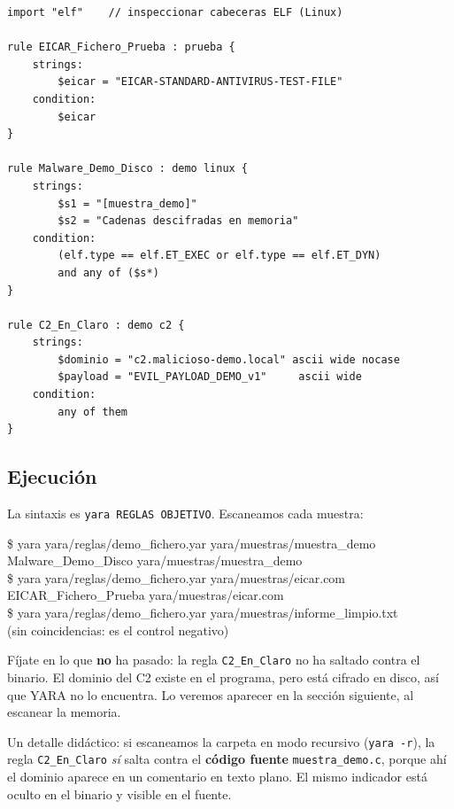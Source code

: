\documentclass[11pt,a4paper]{article}
\begin{document}
\begin{lstlisting}[style=yara,caption={\texttt{yara/reglas/demo\_fichero.yar} (extracto)},captionpos=b]
import "elf"    // inspeccionar cabeceras ELF (Linux)

rule EICAR_Fichero_Prueba : prueba {
    strings:
        $eicar = "EICAR-STANDARD-ANTIVIRUS-TEST-FILE"
    condition:
        $eicar
}

rule Malware_Demo_Disco : demo linux {
    strings:
        $s1 = "[muestra_demo]"
        $s2 = "Cadenas descifradas en memoria"
    condition:
        (elf.type == elf.ET_EXEC or elf.type == elf.ET_DYN)
        and any of ($s*)
}

rule C2_En_Claro : demo c2 {
    strings:
        $dominio = "c2.malicioso-demo.local" ascii wide nocase
        $payload = "EVIL_PAYLOAD_DEMO_v1"     ascii wide
    condition:
        any of them
}
\end{lstlisting}

\subsection*{Ejecución}

La sintaxis es \texttt{yara REGLAS OBJETIVO}. Escaneamos cada muestra:

\begin{terminal}
\$ yara yara/reglas/demo\_fichero.yar yara/muestras/muestra\_demo\\
Malware\_Demo\_Disco yara/muestras/muestra\_demo\\[4pt]
\$ yara yara/reglas/demo\_fichero.yar yara/muestras/eicar.com\\
EICAR\_Fichero\_Prueba yara/muestras/eicar.com\\[4pt]
\$ yara yara/reglas/demo\_fichero.yar yara/muestras/informe\_limpio.txt\\
(sin coincidencias: es el control negativo)
\end{terminal}

\begin{ideaclave}
Fíjate en lo que \textbf{no} ha pasado: la regla \texttt{C2\_En\_Claro} no ha
saltado contra el binario. El dominio del C2 existe en el programa, pero está
cifrado en disco, así que YARA no lo encuentra. Lo veremos aparecer en la sección
siguiente, al escanear la memoria.
\end{ideaclave}

Un detalle didáctico: si escaneamos la carpeta en modo recursivo
(\texttt{yara -r}), la regla \texttt{C2\_En\_Claro} \emph{sí} salta contra el
\textbf{código fuente} \texttt{muestra\_demo.c}, porque ahí el dominio aparece en
un comentario en texto plano. El mismo indicador está oculto en el binario y
visible en el fuente.
\end{document}
